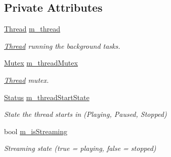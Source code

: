 \subsection*{Private Attributes}
\begin{DoxyCompactItemize}
\item 
\mbox{\label{classsf_1_1_sound_stream_a004d1b16c81698be55779efe0f2b5ed3}} 
\mbox{\hyperlink{classsf_1_1_thread}{Thread}} \mbox{\hyperlink{classsf_1_1_sound_stream_a004d1b16c81698be55779efe0f2b5ed3}{m\+\_\+thread}}
\begin{DoxyCompactList}\small\item\em \mbox{\hyperlink{classsf_1_1_thread}{Thread}} running the background tasks. \end{DoxyCompactList}\item 
\mbox{\label{classsf_1_1_sound_stream_a134d03a5d3075f6a98a85a2edff9ac7d}} 
\mbox{\hyperlink{classsf_1_1_mutex}{Mutex}} \mbox{\hyperlink{classsf_1_1_sound_stream_a134d03a5d3075f6a98a85a2edff9ac7d}{m\+\_\+thread\+Mutex}}
\begin{DoxyCompactList}\small\item\em \mbox{\hyperlink{classsf_1_1_thread}{Thread}} mutex. \end{DoxyCompactList}\item 
\mbox{\label{classsf_1_1_sound_stream_a2e06f2688d7fcf777a9779168067f302}} 
\mbox{\hyperlink{classsf_1_1_sound_source_ac43af72c98c077500b239bc75b812f03}{Status}} \mbox{\hyperlink{classsf_1_1_sound_stream_a2e06f2688d7fcf777a9779168067f302}{m\+\_\+thread\+Start\+State}}
\begin{DoxyCompactList}\small\item\em State the thread starts in (Playing, Paused, Stopped) \end{DoxyCompactList}\item 
\mbox{\label{classsf_1_1_sound_stream_afa20ca6cbb29ee2355d986a3faa7a38f}} 
bool \mbox{\hyperlink{classsf_1_1_sound_stream_afa20ca6cbb29ee2355d986a3faa7a38f}{m\+\_\+is\+Streaming}}
\begin{DoxyCompactList}\small\item\em Streaming state (true = playing, false = stopped) \end{DoxyCompactList}\item 

\end{DoxyCompactItemize}
